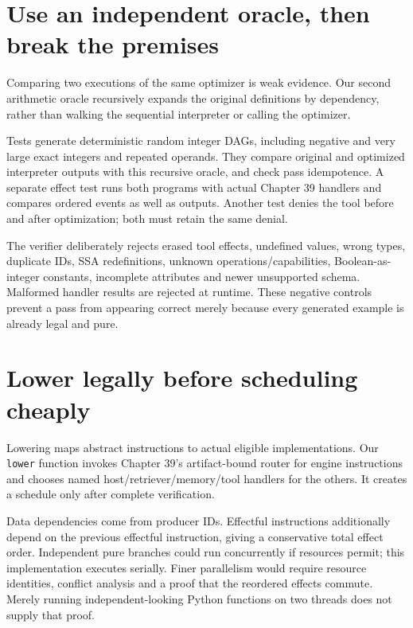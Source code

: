\section{Use an independent oracle, then break the premises}
\label{evod41:oracles}
Comparing two executions of the same optimizer is weak evidence. Our second
arithmetic oracle recursively expands the original definitions by dependency,
rather than walking the sequential interpreter or calling the optimizer.

Tests generate deterministic random integer DAGs, including negative and very
large exact integers and repeated operands. They compare original and optimized
interpreter outputs with this recursive oracle, and check pass idempotence.
A separate effect test runs both programs with actual Chapter 39 handlers and
compares ordered events as well as outputs. Another test denies the tool before
and after optimization; both must retain the same denial.

The verifier deliberately rejects erased tool effects, undefined values,
wrong types, duplicate IDs, SSA redefinitions, unknown operations/capabilities,
Boolean-as-integer constants, incomplete attributes and newer unsupported schema.
Malformed handler results are rejected at runtime. These negative controls
prevent a pass from appearing correct merely because every generated example
is already legal and pure.

\section{Lower legally before scheduling cheaply}
\label{evod41:lower}
Lowering maps abstract instructions to actual eligible implementations.
Our \texttt{lower} function invokes Chapter 39's artifact-bound router for
engine instructions and chooses named host/retriever/memory/tool handlers for
the others. It creates a schedule only after complete verification.

Data dependencies come from producer IDs. Effectful instructions additionally
depend on the previous effectful instruction, giving a conservative total
effect order. Independent pure branches could run concurrently if resources
permit; this implementation executes serially. Finer parallelism would require
resource identities, conflict analysis and a proof that the reordered effects
commute. Merely running independent-looking Python functions on two threads
does not supply that proof.

